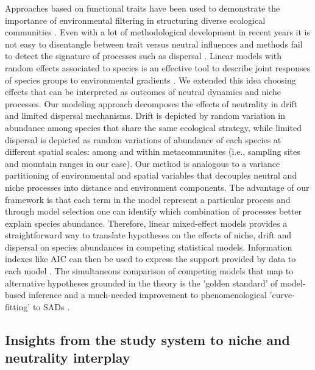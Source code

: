 \documentclass[12pt]{article}
\begin{document}
Approaches based on
functional traits have been used to demonstrate the importance of
environmental  filtering  in  structuring  diverse  ecological
communities \citep{lavorel2002predicting, Baraloto2012}. Even with a
lot of methodological development in recent years it is not easy to
disentangle between trait versus neutral influences and methods fail
to detect the signature of processes such as dispersal
\citep{kembel2009disentangling}. 
Linear models with random effects associated to species is 
an effective tool to describe
joint responses of species groups to environmental
gradients \citep{Jackson2012, Brown2014}. We extended this idea 
 choosing effects that can be interpreted as outcomes of neutral dynamics and niche processes.
Our modeling approach 
decomposes the effects of
neutrality in drift and limited
dispersal mechanisms. Drift is depicted by random variation in
abundance among species that share the same ecological strategy, while
limited dispersal is depicted as random variations of abundance of each
species at different spatial scales: among and within metacommunites (i.e., sampling sites and mountain ranges in our case). 
Our method is analogous to a variance partitioning of environmental and spatial variables \citep{Gilbert2004a} that decouples neutral and niche processes into distance and environment components. The advantage of our framework is that each term in the model represent a particular process and through model selection one can identify which combination of processes better explain species abundance.
Therefore, linear mixed-effect models provides a straightforward way to
translate hypotheses on the effects of niche, drift
and dispersal on species abundances in
competing statistical models. Information indexes like AIC can then be
used to express the support provided by data to each model \citep{Burham2002, Johnson2004}.
The simultaneous comparison of competing models that map
to alternative hypotheses grounded in the theory is the 'golden
standard' of model-based inference \citep{Hilborn1997} 
and a much-needed improvement to
phenomenological 'curve-fitting' to SADs \citep{Mcgill2003}.

\subsection*{Insights from the study system to niche and neutrality interplay}
\end{document}
